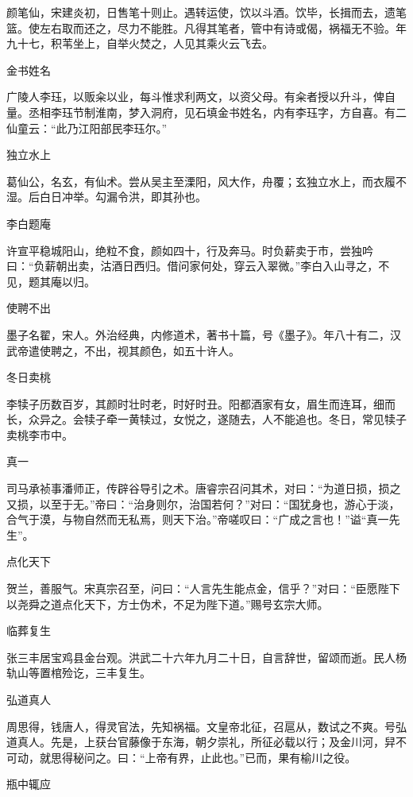 \documentclass[a4paper,12pt,UTF8,twoside]{ctexbook}
\begin{document}
    颜笔仙，宋建炎初，日售笔十则止。遇转运使，饮以斗酒。饮毕，长揖而去，遗笔篮。使左右取而还之，尽力不能胜。凡得其笔者，管中有诗或偈，祸福无不验。年九十七，积苇坐上，自举火焚之，人见其乘火云飞去。
    
    金书姓名
    
    广陵人李珏，以贩籴以业，每斗惟求利两文，以资父母。有籴者授以升斗，俾自量。丞相李珏节制淮南，梦入洞府，见石填金书姓名，内有李珏字，方自喜。有二仙童云：“此乃江阳部民李珏尔。”
    
    独立水上
    
    葛仙公，名玄，有仙术。尝从吴主至溧阳，风大作，舟覆；玄独立水上，而衣履不湿。后白日冲举。勾漏令洪，即其孙也。
    
    李白题庵
    
    许宣平稳城阳山，绝粒不食，颜如四十，行及奔马。时负薪卖于市，尝独吟曰：“负薪朝出卖，沽酒日西归。借问家何处，穿云入翠微。”李白入山寻之，不见，题其庵以归。
    
    使聘不出
    
    墨子名翟，宋人。外治经典，内修道术，著书十篇，号《墨子》。年八十有二，汉武帝遣使聘之，不出，视其颜色，如五十许人。
    
    冬日卖桃
    
    李犊子历数百岁，其颜时壮时老，时好时丑。阳都酒家有女，眉生而连耳，细而长，众异之。会犊子牵一黄犊过，女悦之，遂随去，人不能追也。冬日，常见犊子卖桃李市中。
    
    真一
    
    司马承祯事潘师正，传辟谷导引之术。唐睿宗召问其术，对曰：“为道日损，损之又损，以至于无。”帝曰：“治身则尔，治国若何？”对曰：“国犹身也，游心于淡，合气于漠，与物自然而无私焉，则天下治。”帝嗟叹曰：“广成之言也！”谥“真一先生”。
    
    点化天下
    
    贺兰，善服气。宋真宗召至，问曰：“人言先生能点金，信乎？”对曰：“臣愿陛下以尧舜之道点化天下，方士伪术，不足为陛下道。”赐号玄宗大师。
    
    临葬复生
    
    张三丰居宝鸡县金台观。洪武二十六年九月二十日，自言辞世，留颂而逝。民人杨轨山等置棺殓讫，三丰复生。
    
    弘道真人
    
    周思得，钱唐人，得灵官法，先知祸福。文皇帝北征，召扈从，数试之不爽。号弘道真人。先是，上获台官藤像于东海，朝夕崇礼，所征必载以行；及金川河，舁不可动，就思得秘问之。曰：“上帝有界，止此也。”已而，果有榆川之役。
    
    瓶中辄应
    
\end{document}
